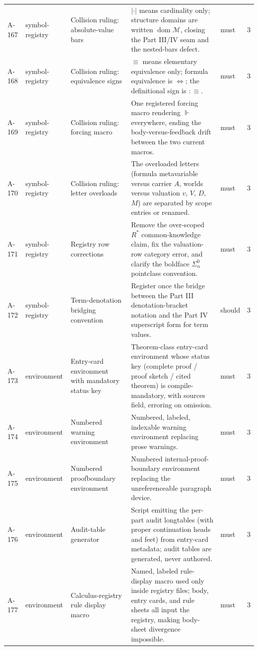\begin{longtable}{@{}p{0.45in}p{0.78in}p{2.02in}p{2.6in}p{0.42in}p{0.16in}@{}}
A-167 & symbol-registry & Collision ruling: absolute-value bars & \(\lvert\cdot\rvert\) means cardinality only; structure domains are written \(\operatorname{dom}\mathcal M\), closing the Part III/IV seam and the nested-bars defect. & must & 3 \\
A-168 & symbol-registry & Collision ruling: equivalence signs & \(\equiv\) means elementary equivalence only; formula equivalence is \(\Leftrightarrow\); the definitional sign is \(:\equiv\). & must & 3 \\
A-169 & symbol-registry & Collision ruling: forcing macro & One registered forcing macro rendering \(\Vdash\) everywhere, ending the body-versus-feedback drift between the two current macros. & must & 3 \\
A-170 & symbol-registry & Collision ruling: letter overloads & The overloaded letters (formula metavariable versus carrier \(A\), worlds versus valuation \(v\), \(V\), \(D\), \(M\)) are separated by scope entries or renamed. & must & 3 \\
A-171 & symbol-registry & Registry row corrections & Remove the over-scoped \(R^*\) common-knowledge claim, fix the valuation-row category error, and clarify the boldface \(\Sigma^0_n\) pointclass convention. & must & 3 \\
A-172 & symbol-registry & Term-denotation bridging convention & Register once the bridge between the Part III denotation-bracket notation and the Part IV superscript form for term values. & should & 3 \\
A-173 & environment & Entry-card environment with mandatory status key & Theorem-class entry-card environment whose status key (complete proof / proof sketch / cited theorem) is compile-mandatory, with sources field, erroring on omission. & must & 3 \\
A-174 & environment & Numbered warning environment & Numbered, labeled, indexable warning environment replacing prose warnings. & must & 3 \\
A-175 & environment & Numbered proofboundary environment & Numbered internal-proof-boundary environment replacing the unreferenceable paragraph device. & must & 3 \\
A-176 & environment & Audit-table generator & Script emitting the per-part audit longtables (with proper continuation heads and feet) from entry-card metadata; audit tables are generated, never authored. & must & 3 \\
A-177 & environment & Calculus-registry rule display macro & Named, labeled rule-display macro used only inside registry files; body, entry cards, and rule sheets all input the registry, making body-sheet divergence impossible. & must & 3 \\

\end{longtable}
